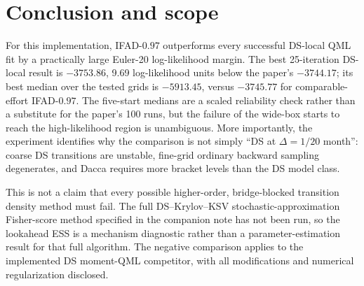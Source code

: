 \documentclass[11pt]{article}
\begin{document}
\section{Conclusion and scope}

For this implementation, IFAD-$0.97$ outperforms every successful DS-local QML
fit by a practically large Euler-20 log-likelihood margin.  The best
25-iteration DS-local result is $-3753.86$, 9.69 log-likelihood units below the
paper's $-3744.17$; its best median over the tested grids is $-5913.45$, versus
$-3745.77$ for comparable-effort IFAD-$0.97$.  The five-start medians are a
scaled reliability check rather than a substitute for the paper's 100 runs,
but the failure of the wide-box starts to reach the high-likelihood region is
unambiguous.  More importantly,
the experiment identifies why the comparison is not simply ``DS at
$\Delta=1/20$ month'': coarse DS transitions are unstable, fine-grid ordinary
backward sampling degenerates, and Dacca requires more bracket levels than the
DS model class.

This is not a claim that every possible higher-order, bridge-blocked transition
density method must fail.  The full DS--Krylov--KSV stochastic-approximation
Fisher-score method specified in the companion note has not been run, so the
lookahead ESS is a
mechanism diagnostic rather than a parameter-estimation result for that full
algorithm.  The negative comparison applies to the implemented DS moment-QML
competitor, with all modifications and numerical regularization disclosed.
\end{document}
